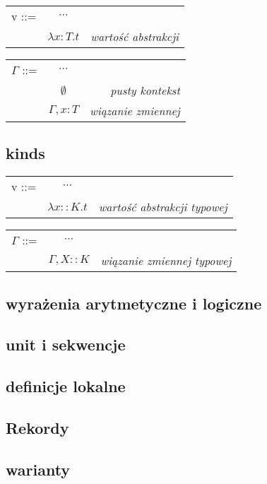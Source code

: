 \documentclass[11pt,leqno]{article}
\begin{document}
\begin{tabular}{ l c r }
  v ::= & $\cdots$ &  \\
   & $\lambda x:T.t$ & \textit{wartość abstrakcji} \\
\end{tabular}



\begin{tabular}{ l c r }
  $\Gamma$ ::= & $\cdots$ &  \\
   & $\emptyset$ & \textit{pusty kontekst} \\
   & $\Gamma,x:T$& \textit{wiązanie zmiennej} \\ 
\end{tabular}



\subsection{kinds}



\begin{tabular}{ l c r }
  v ::= & $\cdots$ &  \\
   & $\lambda x::K.t$ & \textit{wartość abstrakcji typowej} \\
\end{tabular}

\begin{tabular}{ l c r }
  $\Gamma$ ::= & $\cdots$ &  \\
   & $\Gamma,X::K$& \textit{wiązanie zmiennej typowej} \\ 
\end{tabular}

\subsection{wyrażenia arytmetyczne i logiczne}
\subsection{unit i sekwencje}
\subsection{definicje lokalne}
\subsection{Rekordy}
\subsection{warianty}
\end{document}

